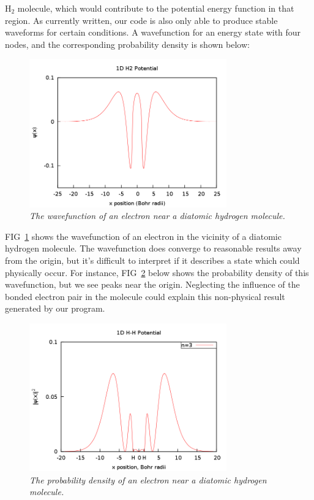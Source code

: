 \documentclass[aps,prl,twocolumn,superscriptaddress]{revtex4-1}
\begin{document}
H$_2$ molecule, which would contribute to the potential energy function in that region. As currently written, our code is also only able to produce stable waveforms for certain conditions. A wavefunction for an energy state with four nodes, and the corresponding probability density is shown below: 
\newpage
\begin{figure}[h!]
  \begin{center}
\centerline{\includegraphics[width=3.35in]{H2.png}}
\caption{\it \small{The wavefunction of an electron near a diatomic hydrogen molecule. \label{hydrogen}}}
  \end{center}
\end{figure}
FIG~\ref{hydrogen} shows the wavefunction of an electron in the vicinity of a diatomic hydrogen molecule. The wavefunction does converge to reasonable results away from the origin, but it's difficult to interpret if it describes a state which could physically occur. For instance, FIG~\ref{hydrogenprob} below shows the probability density of this wavefunction, but we see peaks near the origin. Neglecting the influence of the bonded electron pair in the molecule could explain this non-physical result generated by our program. 
\begin{figure}[h!]
  \begin{center}
\centerline{\includegraphics[width=3.35in]{H22n.png}}
\caption{\it \small{The probability density of an electron near a diatomic hydrogen molecule. \label{hydrogenprob}}}
  \end{center}
\end{figure}
\newpage
\end{document}
